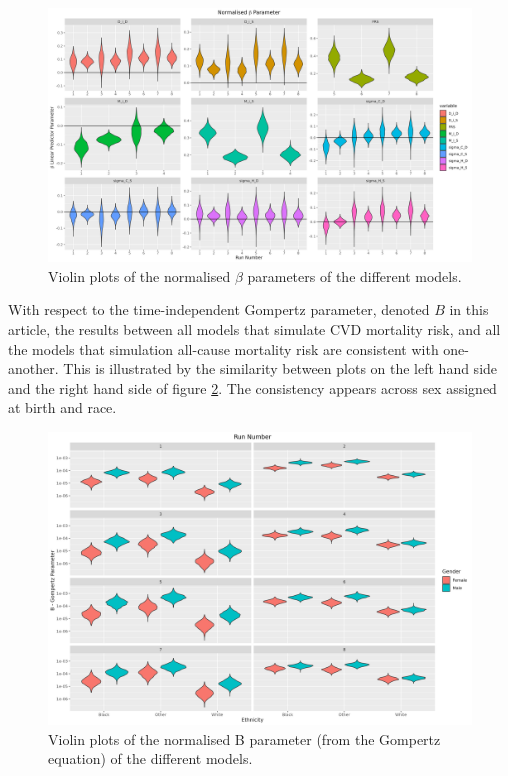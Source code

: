 \documentclass[
]{article}
\begin{document}
\begin{figure}
\hypertarget{fig:betas}{%
\centering
\includegraphics{./Plots/beta/Beta_parameter_normalised.png}
\caption{Violin plots of the normalised \(\beta\) parameters of the different models.}\label{fig:betas}
}
\end{figure}

With respect to the time-independent Gompertz parameter, denoted \(B\) in this article, the results between all models that simulate CVD mortality risk, and all the models that simulation all-cause mortality risk are consistent with one-another. This is illustrated by the similarity between plots on the left hand side and the right hand side of figure \ref{fig:gompB}. The consistency appears across sex assigned at birth and race.

\begin{figure}
\hypertarget{fig:gompB}{%
\centering
\includegraphics{./Plots/gompertz/B_parameter.png}
\caption{Violin plots of the normalised B parameter (from the Gompertz equation) of the different models.}\label{fig:gompB}
}
\end{figure}
\end{document}
